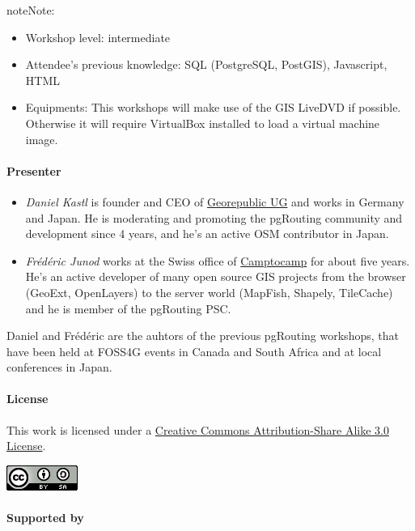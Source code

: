 \documentclass[a4paper,10pt,english]{manual}
\begin{document}
\begin{notice}{note}{Note:}\begin{itemize}
\item {} 
Workshop level: intermediate

\item {} 
Attendee's previous knowledge: SQL (PostgreSQL, PostGIS), Javascript, HTML

\item {} 
Equipments: This workshops will make use of the GIS LiveDVD if possible. Otherwise it will require VirtualBox installed to load a virtual machine image.

\end{itemize}
\end{notice}
\paragraph{Presenter}
\begin{itemize}
\item {} 
\emph{Daniel Kastl} is founder and CEO of \href{http://georepublic.de}{Georepublic UG} and works in Germany and Japan. He is moderating and promoting the pgRouting community and development since 4 years, and he's an active OSM contributor in Japan.

\item {} 
\emph{Frédéric Junod} works at the Swiss office of \href{http://www.camptocamp.com}{Camptocamp} for about five years. He's an active developer of many open source GIS projects from the browser (GeoExt, OpenLayers) to the server world (MapFish, Shapely, TileCache) and he is member of the pgRouting PSC.

\end{itemize}

Daniel and Frédéric are the auhtors of the previous pgRouting workshops, that have been held at FOSS4G events in Canada and South Africa and at local conferences in Japan.
\paragraph{License}

This work is licensed under a \href{http://creativecommons.org/licenses/by-sa/3.0/}{Creative Commons Attribution-Share Alike 3.0 License}.

\includegraphics{license.png}
\paragraph{Supported by}
\end{document}
